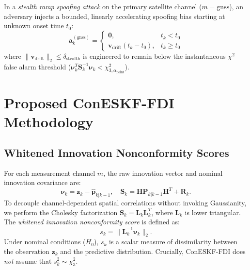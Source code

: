 \documentclass[journal,twocolumn]{IEEEtran}
\begin{document}
In a \emph{stealth ramp spoofing attack} on the primary satellite channel ($m = \text{gnss}$), an adversary injects a bounded, linearly accelerating spoofing bias starting at unknown onset time $t_0$:
\begin{equation}
    \mathbf{a}_k^{(\text{gnss})} = \begin{cases} \mathbf{0}, & t_k < t_0 \\ \mathbf{v}_{\text{drift}} (t_k - t_0), & t_k \ge t_0 \end{cases}
\end{equation}
where $\|\mathbf{v}_{\text{drift}}\|_2 \le \delta_{\text{stealth}}$ is engineered to remain below the instantaneous $\chi^2$ false alarm threshold ($\bm{\nu}_k^T \mathbf{S}_k^{-1} \bm{\nu}_k < \chi^2_{3, \alpha_{\text{point}}}$).

\section{Proposed ConESKF-FDI Methodology}
\label{sec:methodology}

\subsection{Whitened Innovation Nonconformity Scores}
For each measurement channel $m$, the raw innovation vector and nominal innovation covariance are:
\begin{equation}
    \bm{\nu}_k = \mathbf{z}_k - \hat{\mathbf{p}}_{k|k-1}, \quad \mathbf{S}_k = \mathbf{H} \mathbf{P}_{k|k-1} \mathbf{H}^T + \mathbf{R}_k.
\end{equation}
To decouple channel-dependent spatial correlations without invoking Gaussianity, we perform the Cholesky factorization $\mathbf{S}_k = \mathbf{L}_k \mathbf{L}_k^T$, where $\mathbf{L}_k$ is lower triangular. The \emph{whitened innovation nonconformity score} is defined as:
\begin{equation}
    s_k = \|\mathbf{L}_k^{-1} \bm{\nu}_k\|_2.
    \label{eq:nonconformity_score}
\end{equation}
Under nominal conditions ($H_0$), $s_k$ is a scalar measure of dissimilarity between the observation $\mathbf{z}_k$ and the predictive distribution. Crucially, ConESKF-FDI does \emph{not} assume that $s_k^2 \sim \chi^2_3$.
\end{document}
